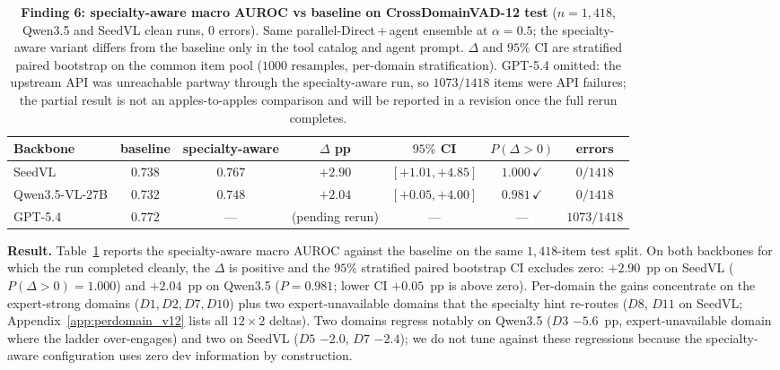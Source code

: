 \begin{table}[t]
\centering
\caption{\textbf{Finding 6: specialty-aware macro AUROC vs baseline on CrossDomainVAD-12 test} ($n{=}1{,}418$, Qwen3.5 and SeedVL clean runs, $0$ errors). Same parallel-Direct\,+\,agent ensemble at $\alpha{=}0.5$; the specialty-aware variant differs from the baseline only in the tool catalog and agent prompt. $\Delta$ and $95\%$ CI are stratified paired bootstrap on the common item pool ($1000$ resamples, per-domain stratification). GPT-5.4 omitted: the upstream API was unreachable partway through the specialty-aware run, so $1073/1418$ items were API failures; the partial result is not an apples-to-apples comparison and will be reported in a revision once the full rerun completes.}
\label{tab:v12_vs_v10}
\small
\setlength{\tabcolsep}{4pt}
\begin{tabular}{l|cc|ccc|c}
\toprule
Backbone & baseline & specialty-aware & $\Delta$ pp & $95\%$ CI & $P(\Delta\!>\!0)$ & errors \\
\midrule
SeedVL            & $0.738$ & $0.767$ & $\mathbf{+2.90}$ & $[+1.01, +4.85]$ & $1.000\,\checkmark$ & $0/1418$ \\
Qwen3.5-VL-27B    & $0.732$ & $0.748$ & $\mathbf{+2.04}$ & $[+0.05, +4.00]$ & $0.981\,\checkmark$ & $0/1418$ \\
GPT-5.4           & $0.772$ & --- & (pending rerun) & --- & --- & $1073/1418$ \\
\bottomrule
\end{tabular}
\end{table}

\textbf{Result.} Table~\ref{tab:v12_vs_v10} reports the specialty-aware
macro AUROC against the baseline on the same $1{,}418$-item test split.
On both backbones for which the run completed cleanly, the $\Delta$ is
positive and the $95\%$ stratified paired bootstrap CI excludes zero:
$+2.90$~pp on SeedVL ($P(\Delta\!>\!0){=}1.000$) and $+2.04$~pp on
Qwen3.5 ($P{=}0.981$; lower CI $+0.05$~pp is above zero). Per-domain
the gains concentrate on the expert-strong domains ($D1,D2,D7,D10$)
plus two expert-unavailable domains that the specialty hint re-routes
($D8$, $D11$ on SeedVL; Appendix~\ref{app:perdomain_v12} lists all
$12\times 2$ deltas). Two domains regress notably on Qwen3.5 ($D3$
$-5.6$~pp, expert-unavailable domain where the ladder over-engages)
and two on SeedVL ($D5$ $-2.0$, $D7$ $-2.4$); we do not tune against
these regressions because the specialty-aware configuration uses zero
dev information by construction.

